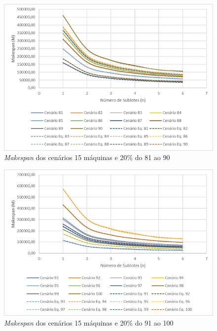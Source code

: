 \begin{figure}[H]
    \centering
     \includegraphics[width=13cm]{Apendices/Figuras/15m20_81-90.png}
     \caption{\textit{Makespan} dos cenários 15 máquinas e 20\% do 81 ao 90}
    \label{fig:15m20_81-90}
\end{figure}

\begin{figure}[H]
    \centering
     \includegraphics[width=13cm]{Apendices/Figuras/15m20_91-100.png}
     \caption{\textit{Makespan} dos cenários 15 máquinas e 20\% do 91 ao 100}
    \label{fig:15m20_91-100}
\end{figure}